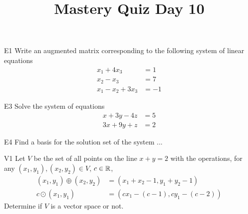 \documentclass{sbgLAquiz}
\title{Mastery Quiz Day 10 }
\begin{document}
\begin{problem}{E1}
Write an augmented matrix corresponding to the following system of linear equations
\begin{align*}
x_1+4x_3 &= 1 \\
x_2-x_3 &= 7 \\
x_1-x_2+3x_3 &= -1
\end{align*}
\end{problem}

\begin{problem}{E3}
Solve the system of equations
\begin{align*}
x+3y-4z &= 5 \\
3x+9y+z &= 2
\end{align*}
\end{problem}
\newpage

\begin{problem}{E4}
Find a basis for the solution set of the system ...
\end{problem}

\begin{problem}{V1}
Let $V$ be the set of all points on the line $x+y=2$ with the operations, for any $(x_1,y_1), (x_2,y_2) \in V$, $c \in \mathbb{R}$,
\begin{align*}
(x_1,y_1) \oplus (x_2,y_2) &= (x_1+x_2-1,y_1+y_2-1) \\
c \odot (x_1,y_1) &= (cx_1-(c-1), cy_1-(c-2))
\end{align*}
Determine if $V$ is a vector space or not.
\end{problem}
\end{document}
